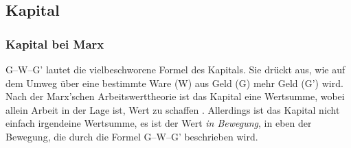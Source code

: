 \documentclass[12pt,
               DIV13,
               paper=a4,
               twoside=false,
               onehalfspacing,
               bibliography=totoc,
               toc=graduated,
               draft,
               ]{scrartcl}
\newcommand{\pc}[2]{\parencite[#1]{#2}}
\newcommand{\vgl}[2]{\parencite[vgl.][#1]{#2}}
\newcommand{\worries}[1]{\ifdraft{\textcolor{blue}{\texttt{(#1)}}}{}}
\newcommand{\gwg}{G--W--G'\xspace}
\begin{document}
%
%
%
%
%

\subsection{Kapital}

\subsubsection{Kapital bei Marx}

\gwg lautet die vielbeschworene Formel des Kapitals. Sie drückt aus,
wie auf dem Umweg über eine bestimmte Ware (W) aus Geld (G) mehr Geld
(G') wird. Nach der Marx'schen Arbeitswerttheorie ist das Kapital eine
Wertsumme, wobei allein Arbeit in der Lage ist, Wert zu schaffen
\worries{Beleg}. Allerdings ist das Kapital nicht einfach irgendeine
Wertsumme, es ist der Wert \emph{in Bewegung}, in eben der Bewegung,
die durch die Formel \gwg beschrieben wird.
\end{document}

